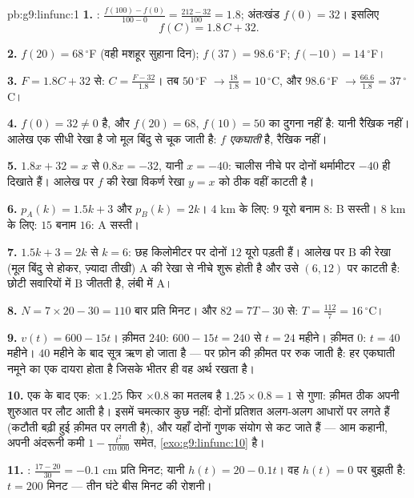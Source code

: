 \begin{solution}{pb:g9:linfunc:1}
\textbf{1.} : $\frac{f(100) - f(0)}{100 - 0} =
\frac{212 - 32}{100} = 1.8$; अंतःखंड $f(0) = 32$। इसलिए
\[
f(C) = 1.8\,C + 32 .
\]

\textbf{2.} $f(20) = 68\,^\circ$F (वही मशहूर सुहाना दिन);
$f(37) = 98.6\,^\circ$F; $f(-10) = 14\,^\circ$F।

\textbf{3.} $F = 1.8C + 32$ से:
$C = \frac{F - 32}{1.8}$। तब $50\,^\circ$F
$\to \frac{18}{1.8} = 10\,^\circ$C, और $98.6\,^\circ$F
$\to \frac{66.6}{1.8} = 37\,^\circ$C।

\textbf{4.} $f(0) = 32 \neq 0$ है, और $f(20) = 68$, $f(10) = 50$ का
दुगना नहीं है: यानी रैखिक नहीं। आलेख एक सीधी रेखा है जो मूल बिंदु से
चूक जाती है: $f$ \emph{एकघाती} है, रैखिक नहीं।

\textbf{5.} $1.8x + 32 = x$ से $0.8x = -32$, यानी $x = -40$: चालीस
नीचे पर दोनों थर्मामीटर $-40$ ही दिखाते हैं। आलेख पर $f$ की रेखा
विकर्ण रेखा $y = x$ को ठीक वहीं काटती है।

\textbf{6.} $p_A(k) = 1.5k + 3$ और $p_B(k) = 2k$। $4$ km के लिए:
$9$ यूरो बनाम $8$: B सस्ती। $8$ km के लिए: $15$ बनाम $16$: A सस्ती।

\textbf{7.} $1.5k + 3 = 2k$ से $k = 6$: छह किलोमीटर पर दोनों $12$
यूरो पड़ती हैं। आलेख पर B की रेखा (मूल बिंदु से होकर, ज़्यादा तीखी)
A की रेखा से नीचे शुरू होती है और उसे $(6, 12)$ पर काटती है: छोटी
सवारियों में B जीतती है, लंबी में A।

\textbf{8.} $N = 7 \times 20 - 30 = 110$ बार प्रति मिनट। और
$82 = 7T - 30$ से: $T = \frac{112}{7} = 16\,^\circ$C।

\textbf{9.} $v(t) = 600 - 15t$। क़ीमत $240$: $600 - 15t = 240$ से
$t = 24$ महीने। क़ीमत $0$: $t = 40$ महीने। $40$ महीने के बाद सूत्र ऋण
हो जाता है --- पर फ़ोन की क़ीमत  पर रुक जाती है: हर एकघाती नमूने
का एक दायरा होता है जिसके भीतर ही वह अर्थ रखता है।

\textbf{10.} एक के बाद एक: $\times 1.25$ फिर $\times 0.8$ का मतलब है
$1.25 \times 0.8 = 1$ से गुणा: क़ीमत ठीक अपनी शुरुआत पर लौट आती है।
इसमें चमत्कार कुछ नहीं: दोनों प्रतिशत अलग-अलग आधारों पर लगते हैं
(कटौती बढ़ी हुई क़ीमत पर लगती है), और यहाँ दोनों गुणक संयोग से कट
जाते हैं --- आम कहानी, अपनी अंदरूनी कमी
$1 - \frac{t^2}{10\,000}$ समेत, \cref{exo:g9:linfunc:10} है।

\textbf{11.} : $\frac{17 - 20}{30} = -0.1$ cm प्रति मिनट; यानी
$h(t) = 20 - 0.1t$। वह $h(t) = 0$ पर बुझती है: $t = 200$ मिनट ---
तीन घंटे बीस मिनट की रोशनी।


\end{solution}
